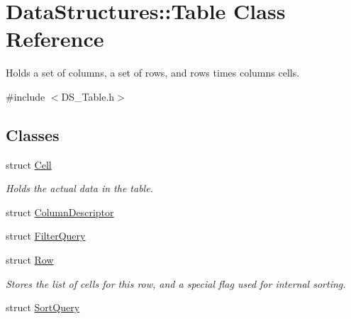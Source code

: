 \hypertarget{class_data_structures_1_1_table}{\section{Data\-Structures\-:\-:Table Class Reference}
\label{class_data_structures_1_1_table}
}


Holds a set of columns, a set of rows, and rows times columns cells.  




{\ttfamily \#include $<$D\-S\-\_\-\-Table.\-h$>$}

\subsection*{Classes}
\begin{DoxyCompactItemize}
\item 
struct \hyperlink{struct_data_structures_1_1_table_1_1_cell}{Cell}
\begin{DoxyCompactList}\small\item\em Holds the actual data in the table. \end{DoxyCompactList}\item 
struct \hyperlink{struct_data_structures_1_1_table_1_1_column_descriptor}{Column\-Descriptor}
\item 
struct \hyperlink{struct_data_structures_1_1_table_1_1_filter_query}{Filter\-Query}
\item 
struct \hyperlink{struct_data_structures_1_1_table_1_1_row}{Row}
\begin{DoxyCompactList}\small\item\em Stores the list of cells for this row, and a special flag used for internal sorting. \end{DoxyCompactList}\item 
struct \hyperlink{struct_data_structures_1_1_table_1_1_sort_query}{Sort\-Query}
\end{DoxyCompactItemize}
